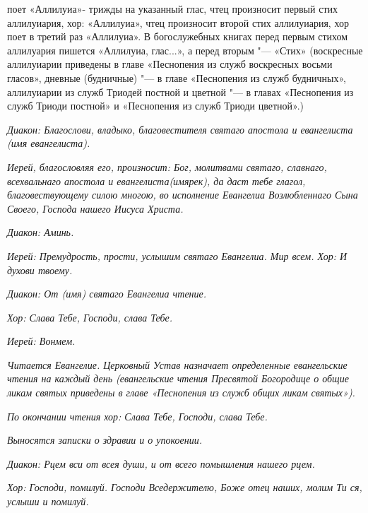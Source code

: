  поет «Аллилуиа»- трижды на указанный глас, чтец произносит первый стих аллилуиария, хор: «Аллилуиа», чтец произносит второй стих аллилуиария, хор поет в третий раз «Аллилуиа». В богослужебных книгах перед первым стихом аллилуария пишется «Аллилуиа, глас...», а перед вторым "--- «Стих» (воскресные аллилуиарии приведены в главе «Песнопения из служб воскресных восьми гласов», дневные (будничные) "--- в главе «Песнопения из служб будничных», аллилуиарии из служб Триодей постной и цветной "--- в главах «Песнопения из служб Триоди постной» и «Песнопения из служб Триоди цветной».)


\itshape Диакон:\normalfont{} Благослови, владыко, благовестителя святаго апостола и евангелиста \itshape (имя евангелиста)\normalfont{}.


\itshape Иерей, благословляя его, произносит:\normalfont{} Бог, молитвами святаго, славнаго, всехвальнаго апостола и евангелиста\itshape  (имярек)\normalfont{}, да даст тебе глагол, благовествующему силою многою, во исполнение Евангелиа Возлюбленнаго Сына Своего, Господа нашего Иисуса Христа.


\itshape Диакон:\normalfont{} Аминь.


\itshape Иерей:\normalfont{} Премудрость, прости, услышим святаго Евангелиа. Мир всем.
\itshape Хор:\normalfont{} И духови твоему.


\itshape Диакон:\normalfont{} От \itshape (имя\normalfont{}) святаго Евангелиа чтение.


\itshape Хор\normalfont{}: Слава Тебе, Господи, слава Тебе.


\itshape Иерей:\normalfont{} Вонмем.




\itshape Читается Евангелие. Церковный Устав назначает определенные евангельские чтения на каждый день (евангельские чтения Пресвятой Богородице о общие ликам святых приведены в главе «Песнопения из служб общих ликам святых»).\normalfont{}


\itshape По окончании чтения хор:\normalfont{} Слава Тебе, Господи, слава Тебе.


\itshape Выносятся записки о здравии и о упокоении.\normalfont{}




\itshape Диакон:\normalfont{} Рцем вси от всея души, и от всего помышления нашего рцем.


\itshape  Хор:\normalfont{} Господи, помилуй. Господи Вседержителю, Боже отец наших, молим Ти ся, услыши и помилуй.


